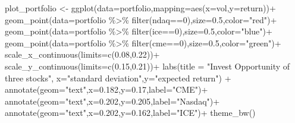 \documentclass[
  letterpaper,
  DIV=11,
  numbers=noendperiod]{scrreprt}
\newenvironment{Shaded}{\begin{snugshade}}{\end{snugshade}}
\newcommand{\AttributeTok}[1]{\textcolor[rgb]{0.40,0.45,0.13}{#1}}
\newcommand{\DecValTok}[1]{\textcolor[rgb]{0.68,0.00,0.00}{#1}}
\newcommand{\FloatTok}[1]{\textcolor[rgb]{0.68,0.00,0.00}{#1}}
\newcommand{\FunctionTok}[1]{\textcolor[rgb]{0.28,0.35,0.67}{#1}}
\newcommand{\NormalTok}[1]{\textcolor[rgb]{0.00,0.23,0.31}{#1}}
\newcommand{\OtherTok}[1]{\textcolor[rgb]{0.00,0.23,0.31}{#1}}
\newcommand{\SpecialCharTok}[1]{\textcolor[rgb]{0.37,0.37,0.37}{#1}}
\newcommand{\StringTok}[1]{\textcolor[rgb]{0.13,0.47,0.30}{#1}}
\begin{document}
\begin{Shaded}
\begin{Highlighting}[]
\NormalTok{plot\_portfolio }\OtherTok{\textless{}{-}} \FunctionTok{ggplot}\NormalTok{(}\AttributeTok{data=}\NormalTok{portfolio,}\AttributeTok{mapping=}\FunctionTok{aes}\NormalTok{(}\AttributeTok{x=}\NormalTok{vol,}\AttributeTok{y=}\NormalTok{return))}\SpecialCharTok{+}
  \FunctionTok{geom\_point}\NormalTok{(}\AttributeTok{data=}\NormalTok{portfolio }\SpecialCharTok{\%\textgreater{}\%} \FunctionTok{filter}\NormalTok{(ndaq}\SpecialCharTok{==}\DecValTok{0}\NormalTok{),}\AttributeTok{size=}\FloatTok{0.5}\NormalTok{,}\AttributeTok{color=}\StringTok{"red"}\NormalTok{)}\SpecialCharTok{+}
  \FunctionTok{geom\_point}\NormalTok{(}\AttributeTok{data=}\NormalTok{portfolio }\SpecialCharTok{\%\textgreater{}\%} \FunctionTok{filter}\NormalTok{(ice}\SpecialCharTok{==}\DecValTok{0}\NormalTok{),}\AttributeTok{size=}\FloatTok{0.5}\NormalTok{,}\AttributeTok{color=}\StringTok{"blue"}\NormalTok{)}\SpecialCharTok{+}
  \FunctionTok{geom\_point}\NormalTok{(}\AttributeTok{data=}\NormalTok{portfolio }\SpecialCharTok{\%\textgreater{}\%} \FunctionTok{filter}\NormalTok{(cme}\SpecialCharTok{==}\DecValTok{0}\NormalTok{),}\AttributeTok{size=}\FloatTok{0.5}\NormalTok{,}\AttributeTok{color=}\StringTok{"green"}\NormalTok{)}\SpecialCharTok{+}
  \FunctionTok{scale\_x\_continuous}\NormalTok{(}\AttributeTok{limits=}\FunctionTok{c}\NormalTok{(}\FloatTok{0.08}\NormalTok{,}\FloatTok{0.22}\NormalTok{))}\SpecialCharTok{+}
  \FunctionTok{scale\_y\_continuous}\NormalTok{(}\AttributeTok{limits=}\FunctionTok{c}\NormalTok{(}\FloatTok{0.15}\NormalTok{,}\FloatTok{0.21}\NormalTok{))}\SpecialCharTok{+}
  \FunctionTok{labs}\NormalTok{(}\AttributeTok{title =} \StringTok{"Invest Opportunity of three stocks"}\NormalTok{,}
       \AttributeTok{x=}\StringTok{"standard deviation"}\NormalTok{,}\AttributeTok{y=}\StringTok{"expected return"}\NormalTok{) }\SpecialCharTok{+}
  \FunctionTok{annotate}\NormalTok{(}\AttributeTok{geom=}\StringTok{"text"}\NormalTok{,}\AttributeTok{x=}\FloatTok{0.182}\NormalTok{,}\AttributeTok{y=}\FloatTok{0.17}\NormalTok{,}\AttributeTok{label=}\StringTok{"CME"}\NormalTok{)}\SpecialCharTok{+}
  \FunctionTok{annotate}\NormalTok{(}\AttributeTok{geom=}\StringTok{"text"}\NormalTok{,}\AttributeTok{x=}\FloatTok{0.202}\NormalTok{,}\AttributeTok{y=}\FloatTok{0.205}\NormalTok{,}\AttributeTok{label=}\StringTok{"Nasdaq"}\NormalTok{)}\SpecialCharTok{+}
  \FunctionTok{annotate}\NormalTok{(}\AttributeTok{geom=}\StringTok{"text"}\NormalTok{,}\AttributeTok{x=}\FloatTok{0.202}\NormalTok{,}\AttributeTok{y=}\FloatTok{0.162}\NormalTok{,}\AttributeTok{label=}\StringTok{"ICE"}\NormalTok{)}\SpecialCharTok{+}
  \FunctionTok{theme\_bw}\NormalTok{()}


\end{Highlighting}
\end{Shaded}
\end{document}
